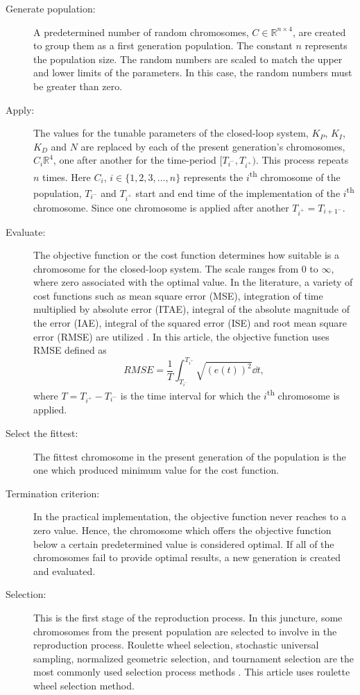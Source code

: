 \documentclass[conference, a4paper, final]{IEEEtran} %
\begin{document}
\begin{description}
    \item[Generate population:] A predetermined number of random chromosomes, $C\in \mathbb{R}^{n\times 4}$, are created to group them as a first generation population. The constant $n$ represents the population size. The random numbers are scaled to match the upper and lower limits of the parameters. In this case, the random numbers must be greater than zero.
    \item[Apply:] The values for the tunable parameters of the closed-loop system, $K_P$, $K_I$, $K_D$ and $N$ are replaced by each of the present generation's chromosomes, $C_i\mathbb{R}^{4}$, one after another for the time-period $[T_{i^-}, T_{i^+})$. This process repeats $n$ times. Here $C_i$, $i \in \{1, 2, 3, \dots, n\}$ represents the $i$\textsuperscript{th} chromosome of the population, $T_{i^-}$ and $T_{i^+}$ start and end time of the implementation of the $i$\textsuperscript{th} chromosome. Since one chromosome is applied after another $T_{i^+} = T_{i+1^-}$.
    \item[Evaluate:] The objective function or the cost function determines how suitable is a chromosome for the closed-loop system. The scale ranges from 0 to $\infty$, where zero associated with the optimal value. In the literature, a variety of cost functions such as mean square error (MSE), integration of time multiplied by absolute error (ITAE), integral of the absolute magnitude of the error (IAE),  integral of the squared error (ISE) and root mean square error (RMSE) are utilized \cite{1300705, kim2008auto}. In this article, the objective function uses RMSE defined as $$RMSE = \frac{1}{T}\int_{T_{i^-}}^{T_{i^+}} \sqrt{(e(t))^2} \dd t,$$ where $T = T_{i^+}-T_{i^-}$ is the time interval for which the $i$\textsuperscript{th} chromosome is applied.
    \item[Select the fittest:] The fittest chromosome in the present generation of the population is the one which produced minimum value for the cost function.
    \item[Termination criterion:] In the practical implementation, the objective function never reaches to a zero value. Hence, the chromosome which offers the objective function below a certain predetermined value is considered optimal. If all of the chromosomes fail to provide optimal results, a new generation is created and evaluated.
    \item[Selection:] This is the first stage of the reproduction process. In this juncture, some chromosomes from the present population are selected to involve in the reproduction process. Roulette wheel selection, stochastic universal sampling,  normalized geometric selection, and tournament selection are the most commonly used selection process methods \cite{gen2000genetic, kim2008auto}. This article uses roulette wheel selection method.

\end{description}
\end{document}
